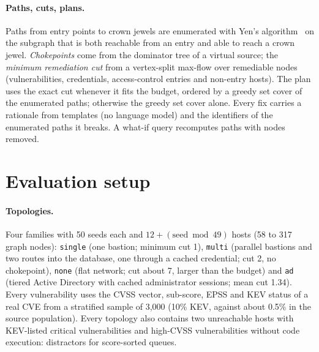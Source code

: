 \documentclass[11pt]{article}
\begin{document}
\paragraph{Paths, cuts, plans.} Paths from entry points to crown jewels are enumerated with Yen's
algorithm~\cite{yen1971finding} on the subgraph that is both reachable from an entry and able to reach a crown jewel.
\emph{Chokepoints} come from the dominator tree of a virtual source; the \emph{minimum remediation cut} from a
vertex-split max-flow over remediable nodes (vulnerabilities, credentials, access-control entries and non-entry
hosts). The plan uses the exact cut whenever it fits the budget, ordered by a greedy set cover of the enumerated paths;
otherwise the greedy set cover alone. Every fix carries a rationale from templates (no language model) and the
identifiers of the enumerated paths it breaks. A what-if query recomputes paths with nodes removed.

\section{Evaluation setup}
\label{sec:setup}

\paragraph{Topologies.} Four families with 50 seeds each and $12 + (\text{seed} \bmod 49)$ hosts (58 to 317 graph
nodes): \texttt{single} (one bastion; minimum cut 1), \texttt{multi} (parallel bastions and two routes into the
database, one through a cached credential; cut 2, no chokepoint), \texttt{none} (flat network; cut about 7, larger than
the budget) and \texttt{ad} (tiered Active Directory with cached administrator sessions; mean cut 1.34). Every
vulnerability uses the CVSS vector, sub-score, EPSS and KEV status of a real CVE from a stratified sample of 3,000
(10\% KEV, against about 0.5\% in the source population). Every topology also contains two unreachable hosts with
KEV-listed critical vulnerabilities and high-CVSS vulnerabilities without code execution: distractors for
score-sorted queues.
\end{document}
